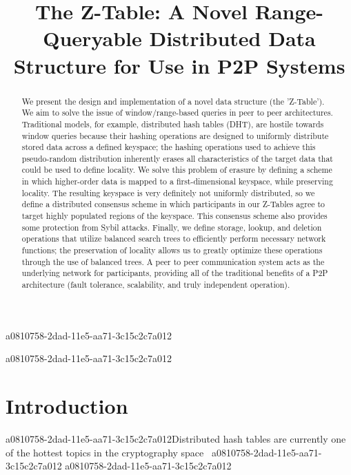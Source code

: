 \documentclass[12pt]{article}
\title{The Z-Table: A Novel Range-Queryable Distributed Data Structure for Use in P2P Systems}
\begin{document}
\maketitle
a0810758-2dad-11e5-aa71-3c15c2c7a012
\begin{abstract}
We present the design and implementation of a novel data structure (the 'Z-Table'). We aim to solve the issue of window/range-based queries in peer to peer architectures. Traditional models, for example,  distributed hash tables (DHT), are hostile towards window queries because their hashing operations are designed to uniformly distribute stored data across a defined keyspace; the hashing operations used to achieve this pseudo-random distribution inherently erases all characteristics of the target data that could be used to define locality. We solve this problem of erasure by defining a scheme in which higher-order data is mapped to a first-dimensional keyspace, while preserving locality. The resulting keyspace is very definitely not uniformly distributed, so we define a distributed consensus scheme in which participants in our Z-Tables agree to target highly populated regions of the keyspace. This consensus scheme also provides some protection from Sybil attacks. Finally, we define storage, lookup, and deletion operations that utilize balanced search trees to efficiently perform necessary network functions; the preservation of locality allows us to greatly optimize these operations through the use of balanced trees. A peer to peer communication system acts as the underlying network for participants, providing all of the traditional benefits of a P2P architecture (fault tolerance, scalability, and truly independent operation).
\end{abstract}


a0810758-2dad-11e5-aa71-3c15c2c7a012\newpage
\section{Introduction}
a0810758-2dad-11e5-aa71-3c15c2c7a012Distributed hash tables are currently one of the hottest topics in the cryptography space~\cite{Stoica:2001dj,Rowstron:2001ea,Ratnasamy:2001wn}
a0810758-2dad-11e5-aa71-3c15c2c7a012
\printbibliography
a0810758-2dad-11e5-aa71-3c15c2c7a012
\end{document}
